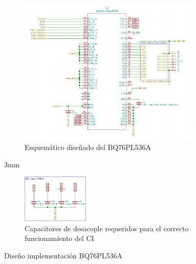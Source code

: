 \documentclass[10pt, a4paper]{report}
\begin{document}
\begin{figure}[!h]
    \begin{subfigure}[b]{\textwidth}
        \begin{center}
            \includegraphics[width=0.95\textwidth]{bq76_implementation.png}
            \caption{Esquem\'atico diseñado del BQ76PL536A}
            \label{fig:bq76_implementation_sch}
        \end{center}
    \end{subfigure}

    \hfill{3mm}

    \begin{subfigure}[b]{\textwidth}
        \begin{center}
            \includegraphics[width=0.35\textwidth]{bq76_desacople.png}
            \caption{Capacitores de desacople requeridos para el correcto
            funcionamiento del \acrshort{CI}}
            \label{fig:bq76_implementation_uncouple}
        \end{center}
    \end{subfigure}
            \caption{Diseño implementación BQ76PL536A}
            \label{fig:bq76_implementation}
\end{figure}
\end{document}

